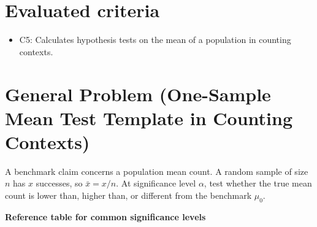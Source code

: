 \newcommand{\TwoTailGraph}[3]{%
\begin{tikzpicture}[x=0.9cm,y=3.0cm]
    \NormalBase
    \fill[blue!20,domain=-3.2:-#1] (-3.2,0) -- plot[samples=90] (\x,{0.4*exp(-\x*\x/2)}) -- (-#1,0) -- cycle;
    \fill[blue!20,domain=#1:3.2] (#1,0) -- plot[samples=90] (\x,{0.4*exp(-\x*\x/2)}) -- (3.2,0) -- cycle;
    \def\ObsColor{black}
    \if\relax\detokenize{#2}\relax\else
        \pgfmathtruncatemacro{\RejectFlag}{#1>=#2}
        \ifnum\RejectFlag=1
            \def\ObsColor{green!60!black}
        \else
            \def\ObsColor{red}
        \fi
        \draw[dashed] (#2,0) -- (#2,{0.4*exp(-#2*#2/2)});
        \draw[dashed] (-#2,0) -- (-#2,{0.4*exp(-#2*#2/2)});
        \node[below] at (#2,-0.05) {\scriptsize $z_{\alpha/2}=#2$};
    \fi
    \draw[\ObsColor,dashed] (-#1,0) -- (-#1,{0.4*exp(-#1*#1/2)});
    \draw[\ObsColor,dashed] (#1,0) -- (#1,{0.4*exp(-#1*#1/2)});
    \node[above,text=\ObsColor] at (#1,{0.4*exp(-#1*#1/2)}) {\scriptsize $|z_{obs}|=#1$};
    \node at (0,0.46) {\scriptsize #3};
\end{tikzpicture}%
}



	\maketitle

	\setcounter{tocdepth}{1}
	\setcounter{secnumdepth}{2}
	\tableofcontents

\section*{Evaluated criteria}
\begin{itemize}
    \item C5: Calculates hypothesis tests on the mean of a population in counting contexts.
\end{itemize}


\section{General Problem (One-Sample Mean Test Template in Counting Contexts)}
A benchmark claim concerns a population mean count. A random sample of size \(n\) has \(x\) successes, so \(\bar x=x/n\). At significance level \(\alpha\), test whether the true mean count is lower than, higher than, or different from the benchmark \(\mu_0\).

\textbf{Reference table for common significance levels}

